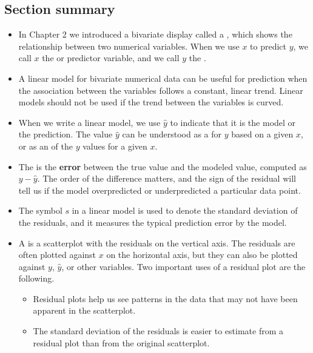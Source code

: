 \subsection*{Section summary}
\begin{itemize}

\item In Chapter 2 we introduced a bivariate display called a , which shows the relationship between two numerical variables.  When we use $x$ to predict $y$, we call $x$ the  or predictor variable, and we call $y$ the .

\item A linear model for bivariate numerical data can be useful for prediction when the association between the variables follows a constant, linear trend.  Linear models should not be used if the trend between the variables is curved.  

\item When we write a linear model, we use $\hat{y}$ to indicate that it is the model or the prediction.   The value $\hat{y}$ can be understood as a  for $y$ based on a given $x$, or as an  of the $y$ values for a given $x$.

\item The  is the \textbf{error} between the true value and the modeled value, computed as $y - \hat{y}$.  The order of the difference matters, and the sign of the residual will tell us if the model overpredicted or underpredicted a particular data point.

\item The symbol $s$ in a linear model is used to denote the standard deviation of the residuals, and it measures the typical prediction error by the model.

\item A  is a scatterplot with the residuals on the vertical axis.  The residuals are often plotted against $x$ on the horizontal axis, but they can also be plotted against $y$, $\hat{y}$, or other variables.  Two important uses of a residual plot are the following.
\begin{itemize}
\item Residual plots help us see patterns in the data that may not have been apparent in the scatterplot.
\item The standard deviation of the residuals is easier to estimate from a residual plot than from the original scatterplot.
\end{itemize}


\end{itemize}
